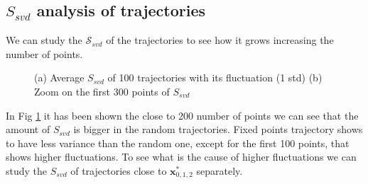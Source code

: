 \documentclass{article}
\begin{document}
\subsection{$S_{svd}$ analysis of trajectories}
We can study the $\mathcal{S}_{svd}$ of the trajectories to see how it grows increasing the number of points.
\begin{figure}[h]
    \caption{(a) Average $S_{svd}$ of 100 trajectories with its fluctuation (1 std) (b) Zoom on the first 300 points of $S_{svd}$}
    \label{fig:SVD-Entropy_statistic}
\end{figure}
In Fig \ref{fig:SVD-Entropy_statistic} it has been shown the close to 200 number of points we can see that the amount of $S_{svd}$ is bigger in the random trajectories.
Fixed points trajectory shows to have less variance than the random one, except for the first 100 points, that shows higher fluctuations.
To see what is the cause of higher fluctuations we can study the $S_{svd}$ of trajectories close to $\boldsymbol{x}^{*}_{0,1,2}$ separately.
\end{document}
